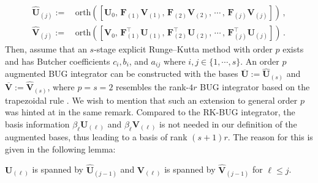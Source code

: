 \documentclass[preprint,runningheads]{svjour3}
\def\wh{\widehat}
\def\wt{\widetilde}
\def\wt{\overline}
\newcommand\bfF{{\mathbf F}}
\newcommand\bfU{{\mathbf U}}
\newcommand\bfV{{\mathbf V}}
\begin{document}
\begin{subequations}\label{eq:augBasisGeneral}
\begin{align}
    \widehat\bfU_{(j)} :=\,& \text{orth}([\bfU_0, \,\bfF_{(1)}\bfV_{(1)}, \,\bfF_{(2)}\bfV_{(2)}, \,\cdots \,, \,\bfF_{(j)}\bfV_{(j)}])\,,\label{eq:augBasisGeneralU} \\ 
    \widehat\bfV_{(j)} :=\,& \text{orth}([\bfV_0, \,\bfF_{(1)}^{\top}\bfU_{(1)}, \,\bfF_{(2)}^{\top}\bfU_{(2)}, \,\cdots\,, \,\bfF_{(j)}^{\top}\bfU_{(j)}])\,. \label{eq:augBasisGeneralV}
\end{align}
\end{subequations}
Then, assume that an $s$-stage explicit Runge--Kutta method with order $p$ exists and has Butcher coefficients $c_i, b_i$, and $a_{ij}$ where $i,j\in\{1,\cdots, s\}$. An order $p$ augmented BUG integrator can be constructed with the bases $\wt\bfU := \wh \bfU_{(s)}$ and $\wt\bfV := \wh \bfV_{(s)}$, where $p=s=2$ resembles the rank-$4r$ BUG integrator based on the trapezoidal rule \cite[Remark~2]{ceruti2024robust}. We wish to mention that such an extension to general order $p$ was hinted at in the same remark. Compared to the RK-BUG integrator, the basis information $\beta_{\ell}\bfU_{(\ell)}$ and $\beta_{\ell}\bfV_{(\ell)}$ is not needed in our definition of the augmented bases, thus leading to a basis of rank $(s+1)r$. The reason for this is given in the following lemma:
\begin{lemma}\label{le:approxU}
    $\bfU_{(\ell)}$ is spanned by $\widehat \bfU_{(j-1)}$ and $\bfV_{(\ell)}$ is spanned by $\widehat \bfV_{(j-1)}$ for $\ell \leq j$.
\end{lemma}
\end{document}
